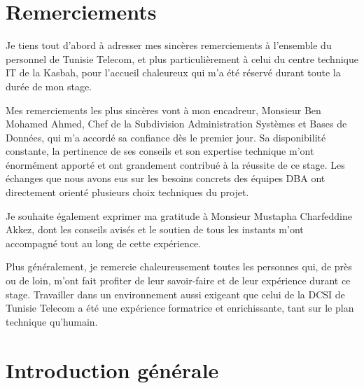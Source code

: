 \documentclass[12pt,a4paper]{report}
\begin{document}
\chapter*{Remerciements}

Je tiens tout d'abord \`a adresser mes sinc\`eres remerciements \`a l'ensemble du
personnel de Tunisie Telecom, et plus particuli\`erement \`a celui du centre
technique IT de la Kasbah, pour l'accueil chaleureux qui m'a \'et\'e r\'eserv\'e
durant toute la dur\'ee de mon stage.

Mes remerciements les plus sinc\`eres vont \`a mon encadreur, Monsieur Ben Mohamed
Ahmed, Chef de la Subdivision Administration Syst\`emes et Bases de Donn\'ees, qui
m'a accord\'e sa confiance d\`es le premier jour. Sa disponibilit\'e constante, la
pertinence de ses conseils et son expertise technique m'ont \'enorm\'ement apport\'e
et ont grandement contribu\'e \`a la r\'eussite de ce stage. Les \'echanges que nous
avons eus sur les besoins concrets des \'equipes DBA ont directement orient\'e
plusieurs choix techniques du projet.

Je souhaite \'egalement exprimer ma gratitude \`a Monsieur Mustapha Charfeddine
Akkez, dont les conseils avis\'es et le soutien de tous les instants m'ont
accompagn\'e tout au long de cette exp\'erience.

Plus g\'en\'eralement, je remercie chaleureusement toutes les personnes qui, de
pr\`es ou de loin, m'ont fait profiter de leur savoir-faire et de leur exp\'erience
durant ce stage. Travailler dans un environnement aussi exigeant que celui de la
DCSI de Tunisie Telecom a \'et\'e une exp\'erience formatrice et enrichissante,
tant sur le plan technique qu'humain.

\tableofcontents
\listoffigures
\listoftables

\chapter*{Introduction g\'en\'erale}
\end{document}

